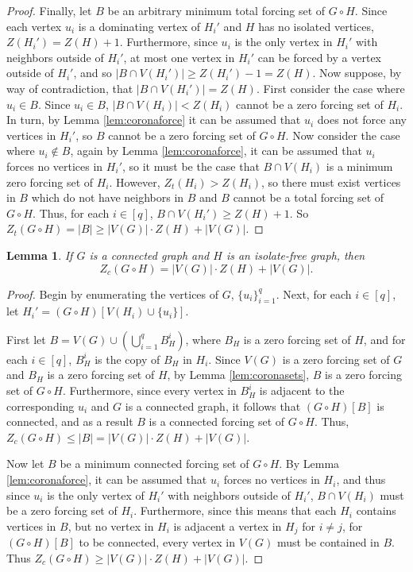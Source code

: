 \documentclass[11pt]{article}
\newtheorem{lem}[thm]{Lemma}
\theoremstyle{definition}
\newcommand{\1}{\vspace{0.1cm}}
\newcommand{\2}{\vspace{0.2cm}}
\newcommand{\3}{\vspace{0.3cm}}
\begin{document}
\begin{proof}
Finally, let $B$ be an arbitrary minimum total forcing set of $G \circ H$.  Since each vertex $u_i$ is a dominating vertex of $H_i'$ and $H$ has no isolated vertices, $Z(H_i')=Z(H)+1$.  Furthermore, since $u_i$ is the only vertex in $H_i'$ with neighbors outside of $H_i'$, at most one vertex in $H_i'$ can be forced by a vertex outside of $H_i'$, and so $|B \cap V(H_i')| \geq Z(H_i')-1=Z(H)$.  Now suppose, by way of contradiction, that $|B \cap V(H_i')|=Z(H)$.  First consider the case where $u_i \in B$.  Since $u_i \in B$, $|B \cap V(H_i)| < Z(H_i)$ cannot be a zero forcing set of $H_i$.  In turn, by Lemma \ref{lem:coronaforce} it can be assumed that $u_i$ does not force any vertices in $H_i'$, so $B$ cannot be a zero forcing set of $G \circ H$.  Now consider the case where $u_i \not \in B$, again by Lemma \ref{lem:coronaforce}, it can be assumed that $u_i$ forces no vertices in $H_i'$, so it must be the case that $B \cap V(H_i)$ is a minimum zero forcing set of $H_i$.  However, $Z_t(H_i)>Z(H_i)$, so there must exist vertices in $B$ which do not have neighbors in $B$ and $B$ cannot be a total forcing set of $G \circ H$.  Thus, for each $i \in [q]$, $B \cap V(H_i') \geq Z(H)+1$.  So $Z_t(G \circ H)=|B|\geq |V(G)|\cdot Z(H)+|V(G)|$.
\end{proof}

\begin{lem}\label{connectcoronaval}
If $G$ is a connected graph and $H$ is an isolate-free graph, then 
\[Z_c(G \circ H)=|V(G)| \cdot Z(H) + |V(G)|.\] 
\end{lem}

\begin{proof}
Begin by enumerating the vertices of $G$, $\{u_i\}_{i=1}^q$.  Next, for each $i \in [q]$, let $H_i'=(G \circ H)[V(H_i) \cup \{u_i\}]$.

First let $B=V(G) \cup \left(\bigcup_{i=1}^{q}B_H^i\right)$, where $B_H$ is a zero forcing set of $H$, and for each $i \in [q]$, $B_H^i$ is the copy of $B_H$ in $H_i$.  Since $V(G)$ is a zero forcing set of $G$ and $B_H$ is a zero forcing set of $H$, by Lemma \ref{lem:coronasets}, $B$ is a zero forcing set of $G \circ H$.  Furthermore, since every vertex in $B_H^i$ is adjacent to the corresponding $u_i$ and $G$ is a connected graph, it follows that $(G \circ H)[B]$ is connected, and as a result $B$ is a connected forcing set of $G \circ H$.  Thus, $Z_c(G \circ H) \leq |B|=|V(G)| \cdot Z(H)+|V(G)|$.  

Now let $B$ be a minimum connected forcing set of $G \circ H$.  By Lemma \ref{lem:coronaforce}, it can be assumed that $u_i$ forces no vertices in $H_i$, and thus since $u_i$ is the only vertex of $H_i'$ with neighbors outside of $H_i'$, $B \cap V(H_i)$ must be a zero forcing set of $H_i$.  Furthermore, since this means that each $H_i$ contains vertices in $B$, but no vertex in $H_i$ is adjacent a vertex in $H_j$ for $i \neq j$, for $(G \circ H)[B]$ to be connected, every vertex in $V(G)$ must be contained in $B$.  Thus $Z_c(G \circ H) \geq |V(G)|\cdot Z(H)+|V(G)|$.
\end{proof}
\end{document}
